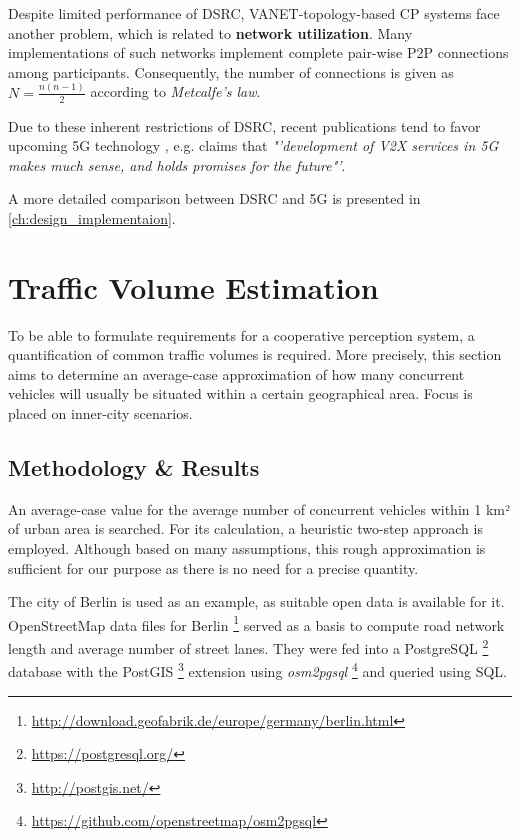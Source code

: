 Despite limited performance of DSRC, VANET-topology-based CP systems face another problem, which is related to \textbf{network utilization}. Many implementations of such networks implement complete pair-wise P2P connections among participants. Consequently, the number of connections is given as $N = \frac{n(n-1)}{2 }$ according to \textit{Metcalfe's law}. 

Due to these inherent restrictions of DSRC, recent publications tend to favor upcoming 5G technology \cite{Briegleb2019, 5GAutomotiveAssociation2016}, e.g. \cite{Wevers2017} claims that \textit{"'development of V2X services in 5G makes much sense, and holds promises for the future"'}.

A more detailed comparison between DSRC and 5G is presented in \autoref{ch:design_implementaion}.

\section{Traffic Volume Estimation}
\label{sec:problem_analysis:traffic_volume_estimation}

To be able to formulate requirements for a cooperative perception system, a quantification of common traffic volumes is required. More precisely, this section aims to determine an average-case approximation of how many concurrent vehicles will usually be situated within a certain geographical area. Focus is placed on inner-city scenarios. 

\subsection{Methodology \& Results}
\label{subsec:problem_analysis:methodology_results}
An average-case value for the average number of concurrent vehicles within 1 km² of urban area is searched. For its calculation, a heuristic two-step approach is employed. Although based on many assumptions, this rough approximation is sufficient for our purpose as there is no need for a precise quantity. 

The city of Berlin is used as an example, as suitable open data is available for it. OpenStreetMap data files for Berlin \footnote{\url{http://download.geofabrik.de/europe/germany/berlin.html}} served as a basis to compute road network length and average number of street lanes. They were fed into a PostgreSQL \footnote{\url{https://postgresql.org/}} database with the PostGIS \footnote{\url{http://postgis.net/}} extension using \textit{osm2pgsql} \footnote{\url{https://github.com/openstreetmap/osm2pgsql}} and queried using SQL.

